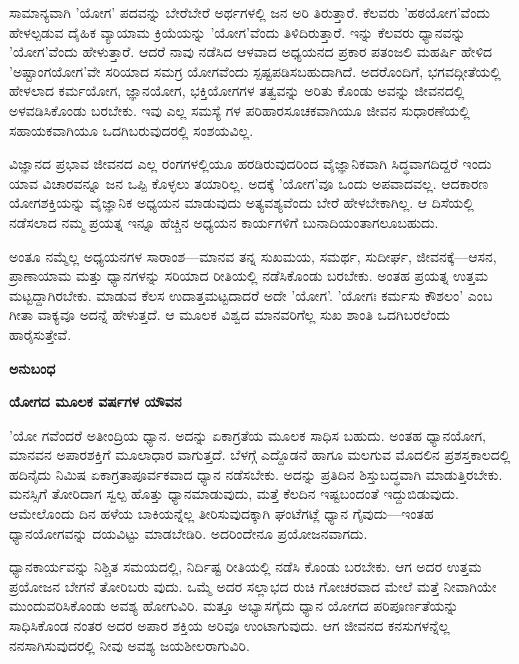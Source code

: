 ಸಾಮಾನ್ಯವಾಗಿ 'ಯೋಗ' ಪದವನ್ನು ಬೇರೆಬೇರೆ ಅರ್ಥಗಳಲ್ಲಿ ಜನ ಅರಿ ತಿರುತ್ತಾರೆ. ಕೆಲವರು 'ಹಠಯೋಗ'ವೆಂದು ಹೇಳಲ್ಪಡುವ ದೈಹಿಕ ವ್ಯಾಯಾಮ ಕ್ರಿಯೆಯನ್ನು 'ಯೋಗ'ವೆಂದು ತಿಳಿದಿರುತ್ತಾರೆ. ಇನ್ನು ಕೆಲವರು ಧ್ಯಾನವನ್ನು 'ಯೋಗ'ವೆಂದು ಹೇಳುತ್ತಾರೆ. ಆದರೆ ನಾವು ನಡೆಸಿದ ಆಳವಾದ ಅಧ್ಯಯನದ ಪ್ರಕಾರ ಪತಂಜಲಿ ಮಹರ್ಷಿ ಹೇಳಿದ 'ಅಷ್ಟಾಂಗಯೋಗ'ವೇ ಸರಿಯಾದ ಸಮಗ್ರ ಯೋಗವೆಂದು ಸ್ಪಷ್ಟಪಡಿಸಬಹುದಾಗಿದೆ. ಅದರೊಂದಿಗೆ, ಭಗವದ್ಗೀತೆಯಲ್ಲಿ ಹೇಳಲಾದ ಕರ್ಮಯೋಗ, ಜ್ಞಾನಯೋಗ, ಭಕ್ತಿಯೋಗಗಳ ತತ್ವವನ್ನು ಅರಿತು ಕೊಂಡು ಅವನ್ನು ಜೀವನದಲ್ಲಿ ಅಳವಡಿಸಿಕೊಂಡು ಬರಬೇಕು. ಇವು ಎಲ್ಲ ಸಮಸ್ಯೆ ಗಳ ಪರಿಹಾರಸೂಚಕವಾಗಿಯೂ ಜೀವನ ಸುಧಾರಣೆಯಲ್ಲಿ ಸಹಾಯಕವಾಗಿಯೂ ಒದಗಿಬರುವುದರಲ್ಲಿ ಸಂಶಯವಿಲ್ಲ.

ವಿಜ್ಞಾನದ ಪ್ರಭಾವ ಜೀವನದ ಎಲ್ಲ ರಂಗಗಳಲ್ಲಿಯೂ ಹರಡಿರುವುದರಿಂದ ವೈಜ್ಞಾನಿಕವಾಗಿ ಸಿದ್ಧವಾಗದಿದ್ದರೆ ಇಂದು ಯಾವ ವಿಚಾರವನ್ನೂ ಜನ ಒಪ್ಪಿ ಕೊಳ್ಳಲು ತಯಾರಿಲ್ಲ. ಅದಕ್ಕೆ 'ಯೋಗ'ವೂ ಒಂದು ಅಪವಾದವಲ್ಲ. ಆದಕಾರಣ ಯೋಗಶಕ್ತಿಯನ್ನು ವೈಜ್ಞಾನಿಕ ಅಧ್ಯಯನ ಮಾಡುವುದು ಅತ್ಯವಶ್ಯವೆಂದು ಬೇರೆ ಹೇಳಬೇಕಾಗಿಲ್ಲ. ಆ ದಿಸೆಯಲ್ಲಿ ನಡೆಸಲಾದ ನಮ್ಮ ಪ್ರಯತ್ನ ಇನ್ನೂ ಹೆಚ್ಚಿನ ಅಧ್ಯಯನ ಕಾರ್ಯಗಳಿಗೆ ಬುನಾದಿಯಂತಾಗಲೂಬಹುದು.

ಅಂತೂ ನಮ್ಮೆಲ್ಲ ಅಧ್ಯಯನಗಳ ಸಾರಾಂಶ—ಮಾನವ ತನ್ನ ಸುಖಮಯ, ಸಮರ್ಥ, ಸುದೀರ್ಘ, ಜೀವನಕ್ಕೆ—ಆಸನ, ಪ್ರಾಣಾಯಾಮ ಮತ್ತು ಧ್ಯಾನಗಳನ್ನು ಸರಿಯಾದ ರೀತಿಯಲ್ಲಿ ನಡೆಸಿಕೊಂಡು ಬರಬೇಕು. ಅಂತಹ ಪ್ರಯತ್ನ ಉತ್ತಮ ಮಟ್ಟದ್ದಾಗಿರಬೇಕು. ಮಾಡುವ ಕೆಲಸ ಉದಾತ್ತಮಟ್ಟದಾದರೆ ಅದೇ 'ಯೋಗ'. 'ಯೋಗಃ ಕರ್ಮಸು ಕೌಶಲಂ' ಎಂಬ ಗೀತಾ ವಾಕ್ಯವೂ ಅದನ್ನೆ ಹೇಳುತ್ತದೆ. ಆ ಮೂಲಕ ವಿಶ್ವದ ಮಾನವರಿಗೆಲ್ಲ ಸುಖ ಶಾಂತಿ ಒದಗಿಬರಲೆಂದು ಹಾರೈಸುತ್ತೇವೆ.

\begin{center}
\textbf{ಅನುಬಂಧ}
\end{center}

\textbf{ಯೋಗದ ಮೂಲಕ  ವರ್ಷಗಳ ಯೌವನ }

'ಯೋ ಗವೆಂದರೆ ಅತೀಂದ್ರಿಯ ಧ್ಯಾನ. ಅದನ್ನು ಏಕಾಗ್ರತೆಯ ಮೂಲಕ ಸಾಧಿಸ ಬಹುದು. ಅಂತಹ ಧ್ಯಾನಯೋಗ, ಮಾನವನ ಅಪಾರಶಕ್ತಿಗೆ ಮೂಲಾಧಾರ ವಾಗುತ್ತದೆ. ಬೆಳಗ್ಗೆ ಎದ್ದೊಡನೆ ಹಾಗೂ ಮಲಗುವ ಮೊದಲಿನ ಪ್ರಶಸ್ತಕಾಲದಲ್ಲಿ ಹದಿನೈದು ನಿಮಿಷ ಏಕಾಗ್ರತಾಪೂರ್ವಕವಾದ ಧ್ಯಾನ ನಡೆಸಬೇಕು. ಅದನ್ನು ಪ್ರತಿದಿನ ಶಿಸ್ತುಬದ್ಧವಾಗಿ ಮಾಡುತ್ತಿರಬೇಕು. ಮನಸ್ಸಿಗೆ ತೋರಿದಾಗ ಸ್ವಲ್ಪ ಹೊತ್ತು ಧ್ಯಾನಮಾಡುವುದು, ಮತ್ತೆ ಕೆಲದಿನ ಇಷ್ಟಬಂದಂತೆ ಇದ್ದುಬಿಡುವುದು. ಆಮೇಲೊಂದು ದಿನ ಹಳೆಯ ಬಾಕಿಯನ್ನೆಲ್ಲ ತೀರಿಸುವುದಕ್ಕಾಗಿ ಘಂಟೆಗಟ್ಲೆ ಧ್ಯಾನ ಗೈವುದು—ಇಂತಹ ಧ್ಯಾನಯೋಗವನ್ನು ದಯವಿಟ್ಟು ಮಾಡಬೇಡಿರಿ. ಅದರಿಂದೇನೂ ಪ್ರಯೋಜನವಾಗದು.

ಧ್ಯಾನಕಾರ್ಯವನ್ನು ನಿಶ್ಚಿತ ಸಮಯದಲ್ಲಿ, ನಿರ್ದಿಷ್ಟ ರೀತಿಯಲ್ಲಿ ನಡೆಸಿ ಕೊಂಡು ಬರಬೇಕು. ಆಗ ಅದರ ಉತ್ತಮ ಪ್ರಯೋಜನ ಬೇಗನೆ ತೋರಿಬರು ವುದು. ಒಮ್ಮೆ ಅದರ ಸಲ್ಲಾಭದ ರುಚಿ ಗೋಚರವಾದ ಮೇಲೆ ಮತ್ತೆ ನೀವಾಗಿಯೇ ಮುಂದುವರಿಸಿಕೊಂಡು ಅವಶ್ಯ ಹೋಗುವಿರಿ. ಮತ್ತೂ ಅಭ್ಯಾಸಗೈದು ಧ್ಯಾನ ಯೋಗದ ಪರಿಪೂರ್ಣತೆಯನ್ನು ಸಾಧಿಸಿಕೊಂಡ ನಂತರ ಅದರ ಅಪಾರ ಶಕ್ತಿಯ ಅರಿವೂ ಉಂಟಾಗುವುದು. ಆಗ ಜೀವನದ ಕನಸುಗಳನ್ನೆಲ್ಲ ನನಸಾಗಿಸುವುದರಲ್ಲಿ ನೀವು ಅವಶ್ಯ ಜಯಶೀಲರಾಗುವಿರಿ.

